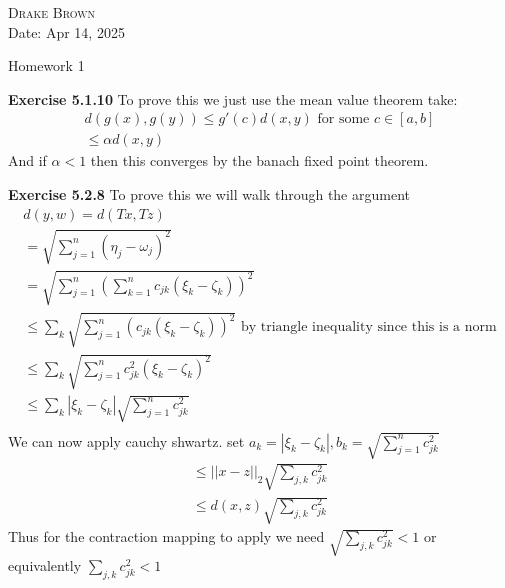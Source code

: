 \documentclass[12pt]{article}
\newenvironment{exercise}[1]{\vspace{.1in}\noindent\textbf{Exercise #1 \hspace{.05em}}}{}
\theoremstyle{definition}
\theoremstyle{remark}
\begin{document}
\begin{flushright}
	\textsc{Drake Brown}  \\
	Date: Apr 14, 2025
\end{flushright}
\begin{center}
	Homework 1
\end{center}

\begin{exercise}{5.1.10}
	To prove this we just use the mean value theorem take:
	\begin{align}
		d(g(x),g(y))\leq g'(c)d(x,y)\text{ for some }c\in [a,b] \\
		\leq \alpha d(x,y)
	\end{align}
	And if $\alpha < 1$ then this converges by the banach fixed point theorem.
\end{exercise}

\begin{exercise}{5.2.8}
	To prove this we will walk through the argument
	\begin{align}
		d(y,w)=d(Tx,Tz)                                                                                                     \\
		=\sqrt{\sum\limits_{j=1}^{n}\left(\eta_j-\omega_j\right)^2}                                                         \\
		=\sqrt{\sum\limits_{j=1}^{n}(\sum_{k=1}^nc_{jk}(\xi_k-\zeta_k))^2}                                                  \\
		\leq \sum_k\sqrt{\sum\limits_{j=1}^{n}(c_{jk}(\xi_k-\zeta_k))^2}\text{ by triangle inequality since this is a norm} \\
		\leq \sum_k\sqrt{\sum\limits_{j=1}^{n}c_{jk}^2(\xi_k-\zeta_k)^2}                                                    \\
		\leq \sum_k|\xi_k-\zeta_k|\sqrt{\sum\limits_{j=1}^{n}c_{jk}^2}                                                      \\
	\end{align}
	We can now apply cauchy shwartz. set $a_k=|\xi_k-\zeta_k|,b_k=\sqrt{\sum\limits_{j=1}^{n}c_{jk}^2}$
	\begin{align}
		\leq ||x-z||_{2}\sqrt{\sum_{j,k}c_{jk}^2} \\
		\leq d(x,z)\sqrt{\sum_{j,k}c_{jk}^2}
	\end{align}
	Thus for the contraction mapping to apply we need $\sqrt{\sum_{j,k}c_{jk}^2}<1$ or equivalently $\sum_{j,k}c_{jk}^2<1$
\end{exercise}
\end{document}
